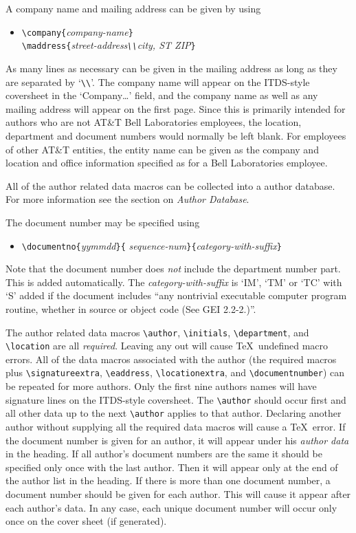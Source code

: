 A company name and mailing address can be given by using
\begin{itemize}
\item[]
\verb|\company{|{\it company-name\/}\verb|}|\\
\verb|\maddress{|{\it street-address\verb|\\|city, ST ZIP\/}\verb|}|
\end{itemize}
As many lines as necessary can be given in the mailing address as
long as they are separated by `\verb|\\|'.  The company name will
appear on the ITDS-style coversheet in the `Company\dots' field, and the
company name as well as any mailing address will appear on the first
page.  Since this is primarily intended for authors who are not 
AT\&T Bell Laboratories employees, the location,
department and document numbers would normally be left blank.
For employees of other AT\&T entities, the entity name can be given
as the company and location and office information specified as for
a Bell Laboratories employee.

All of the author related data macros can be collected into a author
database.  For more information see the section on {\it Author
Database}. 

The document number may be specified using
\begin{itemize}
\item[]
\verb|\documentno{|{\it yymmdd\/}\verb|}{|{\it
sequence-num\/}\verb|}{|{\it category-with-suffix\/}\verb|}|
\end{itemize}
Note that the document number does {\it
not} include the department number part.  This is added
automatically.  The {\it category-with-suffix} is `IM', `TM' or `TC'
with `S' added if the document includes ``any nontrivial executable
computer program routine, whether in source or object code (See GEI
2.2-2.)''.

The author related data macros \verb|\author|,
\verb|\initials|, \verb|\department|, and \verb|\location|
are all {\it required}.  Leaving any out will cause \TeX\ undefined
macro errors.  All of the data macros associated with the author
(the required macros plus \verb|\signatureextra|, \verb|\eaddress|, 
\verb|\locationextra|, and \verb|\documentnumber|) can be repeated 
for more authors.  Only the first nine authors names will have
signature lines on the ITDS-style coversheet.
The \verb|\author| should occur first and all other data up to the 
next \verb|\author| applies to that
author.  Declaring another author without supplying all the required
data macros will cause a \TeX\ error.  If the document number is
given for an author, it will appear under his {\it author data} in
the heading.  If all author's document numbers are the same it
should be specified only once with the last author.  Then it will
appear only at the end of the author list in the heading.  If there
is more than one document number, a document number should be given
for each author.  This will cause it appear after each author's data.  
In any case, each unique document number will occur only once on 
the cover sheet (if generated).

